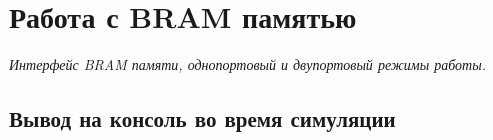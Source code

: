 \chapter{Работа с BRAM памятью}

\emph{Интерфейс BRAM памяти, однопортовый и двупортовый режимы работы.}

\section{Вывод на консоль во время симуляции}
